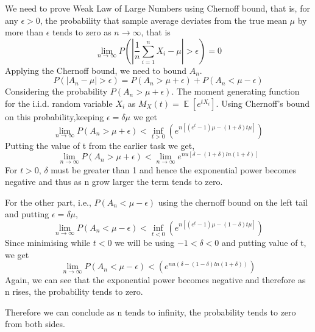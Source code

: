 \begin{solution}
 
 We need to prove Weak Law of Large Numbers using Chernoff bound, that is, for any $\epsilon>0$, the probability that sample average deviates from the true mean $\mu$ by more than $\epsilon$ tends to zero as $n\rightarrow \infty$, that is
 \begin{equation}
     \lim_{n\to\infty}P(|\frac{1}{n}\sum_{i=1}^{n}X_{i}-\mu|>\epsilon)=0  
 \end{equation}
 Applying the Chernoff bound, we need to bound $A_{n}$.
 \begin{equation}
     P(|A_{n}-\mu|> \epsilon )=P(A_{n}>\mu+\epsilon)+P(A_{n}<\mu - \epsilon)
 \end{equation}
 Considering the probability $P(A_{n}>\mu+\epsilon)$. The moment generating function for the i.i.d. random variable $X_{i}$ as $M_{X}(t)=\mathop{\mathbb{E}}[e^{tX_{i}}]$. Using Chernoff's bound on this probability,keeping $\epsilon=\delta\mu$ we get
 \begin{equation}
     \lim_{n\to\infty}P(A_{n}>\mu+\epsilon)< \inf_{t>0}(e^{n[(e^{t}-1)\mu - (1+\delta)t\mu]})
 \end{equation}
 Putting the value of t from the earlier task we get,
 \begin{equation}      
    \lim_{n\to\infty}P(A_{n}>\mu+\epsilon)<\lim_{n\to\infty}e^{nu[\delta-(1+\delta)ln(1+\delta)]}
 \end{equation}
 For $t>0$, $\delta $ must be greater than 1 and hence the exponential power becomes negative and thus as n grow larger the term tends to zero.
 \par For the other part, i.e., $P(A_{n}<\mu - \epsilon)$ using the chernoff bound on the left tail and putting $\epsilon=\delta\mu$,
 \begin{equation}
     \lim_{n\to\infty}P(A_{n}<\mu - \epsilon)< \inf_{t<0}(e^{n[(e^{t}-1)\mu - (1 -\delta)t\mu]})
 \end{equation}
 Since minimising while $t<0$ we will be using $-1<\delta<0$ and putting value of t, we get
 \begin{equation}
     \lim_{n\to\infty}P(A_{n}<\mu - \epsilon)<(e^{nu(\delta-(1-\delta) ln(1+\delta))})
 \end{equation}
 Again, we can see that the exponential power becomes negative and therefore as n rises, the probability tends to zero.
 \par Therefore we can conclude as n tends to infinity, the probability tends to zero from both sides.
		
\end{solution}
